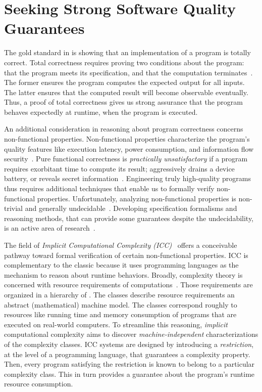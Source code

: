 \section{Seeking Strong Software Quality Guarantees}
\label{sec:aicc-intro}

The gold standard in  is showing that an implementation
of a program is {totally correct}. Total correctness
requires proving two conditions about the program: that the program meets its
specification, and that the computation
terminates~\cite{leino2023}. The former ensures the program computes the
expected output for all inputs. The latter ensures that the computed result will
become observable {eventually}. Thus, a proof of total correctness gives us
strong assurance that the program behaves expectedly at runtime, \ie when the
program is executed.

An additional consideration in reasoning about program correctness concerns
{non-functional} properties. Non-functional
properties characterize the program's quality features like execution latency,
power consumption, and information flow security~\cite{terbeek2018}. Pure
functional correctness is \emph{practically unsatisfactory} if a program
requires exorbitant time to compute its result; aggressively drains a device
battery, or reveals secret information~\cite{heraud2011,aubert20222}.
Engineering truly high-quality programs thus requires additional techniques that
enable us to formally verify non-functional properties. Unfortunately, analyzing
non-functional properties is non-trivial and generally
undecidable~\cite{rice1953}. Developing specification
formalisms and reasoning methods, that can provide some guarantees despite the
undecidability, is an active area of research~\cite{etaps2025}.

The field of \emph{Implicit Computational Complexity (ICC)}~\cite{dallago2011}
offers a conceivable pathway toward formal verification of certain
non-functional properties. ICC is complementary to the classic  because it uses programming languages as the {mechanism} to reason about
runtime behaviors. Broadly, complexity theory is concerned with resource
requirements of computations~\cite{goldreich2008}. Those requirements are
organized in a hierarchy of . The classes describe
resource requirements \wrt an abstract (mathematical) machine model. The classes
correspond roughly to resources like running time and memory consumption of
programs that are executed on real-world computers. To streamline this
reasoning, \emph{implicit} computational complexity aims to discover
\emph{machine-independent} characterizations of the complexity classes. ICC
systems are designed by introducing a \emph{restriction}, at the level of a
programming language, that guarantees a complexity property. Then, every program
satisfying the restriction is known to belong to a particular complexity class.
This in turn provides a guarantee about the program's runtime resource
consumption.

